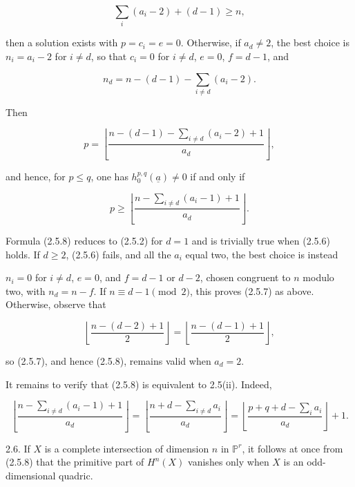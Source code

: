 \begin{equation}\tag{2.5.6}
\sum_i(a_i-2)+(d-1)\geq n,
\end{equation}

then a solution exists with $p=c_i=e=0$.  Otherwise, if $a_d\ne2$, the
best choice is $n_i=a_i-2$ for $i\ne d$, so that $c_i=0$ for $i\ne d$,
$e=0$, $f=d-1$, and

\begin{equation*}
n_d=n-(d-1)-\sum_{i\ne d}(a_i-2).
\end{equation*}

Then

\begin{equation}\tag{2.5.7}
p=\left\lfloor
\frac{n-(d-1)-\sum_{i\ne d}(a_i-2)+1}{a_d}
\right\rfloor,
\end{equation}

and hence, for $p\leq q$, one has
$h_0^{p,q}(\underline a)\ne0$ if and only if

\begin{equation}\tag{2.5.8}
p\geq\left\lfloor
\frac{n-\sum_{i\ne d}(a_i-1)+1}{a_d}
\right\rfloor.
\end{equation}

Formula (2.5.8) reduces to (2.5.2) for $d=1$ and is trivially true when
(2.5.6) holds.  If $d\geq2$, (2.5.6) fails, and all the $a_i$ equal two,
the best choice is instead


$n_i=0$ for $i\ne d$, $e=0$, and $f=d-1$ or $d-2$, chosen congruent to
$n$ modulo two, with $n_d=n-f$.  If $n\equiv d-1\pmod2$, this proves
(2.5.7) as above.  Otherwise, observe that

\begin{equation*}
\left\lfloor\frac{n-(d-2)+1}{2}\right\rfloor
=\left\lfloor\frac{n-(d-1)+1}{2}\right\rfloor,
\end{equation*}

so (2.5.7), and hence (2.5.8), remains valid when $a_d=2$.

It remains to verify that (2.5.8) is equivalent to 2.5(ii).  Indeed,

\begin{equation*}
\left\lfloor\frac{n-\sum_{i\ne d}(a_i-1)+1}{a_d}\right\rfloor
=\left\lfloor\frac{n+d-\sum_{i\ne d}a_i}{a_d}\right\rfloor
=\left\lfloor\frac{p+q+d-\sum_i a_i}{a_d}\right\rfloor+1.
\end{equation*}

2.6. If $X$ is a complete intersection of dimension $n$ in
$\mathbb P^r$, it follows at once from (2.5.8) that the primitive part of
$H^n(X)$ vanishes only when $X$ is an odd-dimensional quadric.

